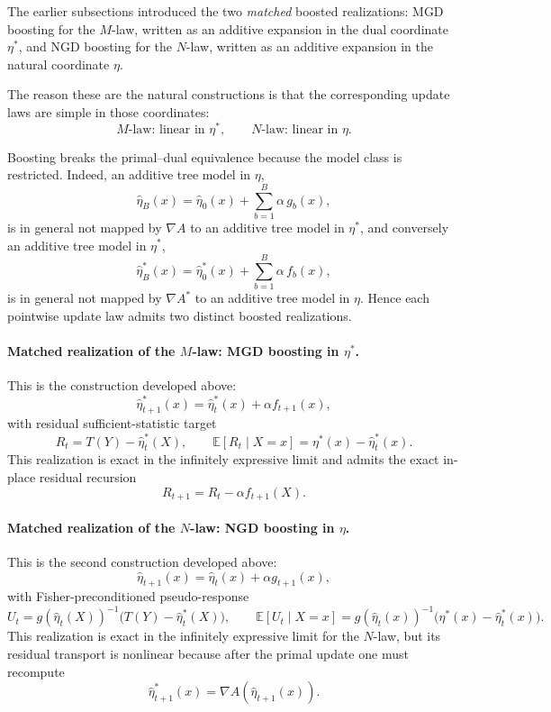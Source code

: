 \documentclass[11pt]{article}
\begin{document}
The earlier subsections introduced the two \emph{matched} boosted realizations:
MGD boosting for the \(M\)-law, written as an additive expansion in the dual coordinate \(\eta^\ast\), and NGD boosting for the \(N\)-law, written as an additive expansion in the natural coordinate \(\eta\).

The reason these are the natural constructions is that the corresponding update laws are simple in those coordinates:
\[
\text{\(M\)-law: linear in }\eta^\ast,
\qquad
\text{\(N\)-law: linear in }\eta.
\]

Boosting breaks the primal--dual equivalence because the model class is restricted. Indeed, an additive tree model in \(\eta\),
\[
\hat\eta_B(x)=\hat\eta_0(x)+\sum_{b=1}^B \alpha\,g_b(x),
\]
is in general not mapped by \(\nabla A\) to an additive tree model in \(\eta^\ast\), and conversely an additive tree model in \(\eta^\ast\),
\[
\hat\eta_B^\ast(x)=\hat\eta_0^\ast(x)+\sum_{b=1}^B \alpha\,f_b(x),
\]
is in general not mapped by \(\nabla A^\ast\) to an additive tree model in \(\eta\). Hence each pointwise update law admits two distinct boosted realizations.

\paragraph{Matched realization of the \(M\)-law: MGD boosting in \(\eta^\ast\).}
This is the construction developed above:
\[
\hat\eta^\ast_{t+1}(x)=\hat\eta^\ast_t(x)+\alpha f_{t+1}(x),
\]
with residual sufficient-statistic target
\[
R_t=T(Y)-\hat\eta_t^\ast(X),
\qquad
\mathbb E[R_t\mid X=x]=\eta^\ast(x)-\hat\eta_t^\ast(x).
\]
This realization is exact in the infinitely expressive limit and admits the exact in-place residual recursion
\[
R_{t+1}=R_t-\alpha f_{t+1}(X).
\]

\paragraph{Matched realization of the \(N\)-law: NGD boosting in \(\eta\).}
This is the second construction developed above:
\[
\hat\eta_{t+1}(x)=\hat\eta_t(x)+\alpha g_{t+1}(x),
\]
with Fisher-preconditioned pseudo-response
\[
U_t=g(\hat\eta_t(X))^{-1}\bigl(T(Y)-\hat\eta_t^\ast(X)\bigr),
\qquad
\mathbb E[U_t\mid X=x]
=
g(\hat\eta_t(x))^{-1}\bigl(\eta^\ast(x)-\hat\eta_t^\ast(x)\bigr).
\]
This realization is exact in the infinitely expressive limit for the \(N\)-law, but its residual transport is nonlinear because after the primal update one must recompute
\[
\hat\eta^\ast_{t+1}(x)=\nabla A(\hat\eta_{t+1}(x)).
\]
\end{document}
